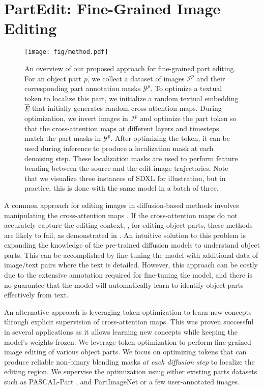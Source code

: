 
\section{PartEdit: Fine-Grained Image Editing}
\label{sec:method}

\begin{figure*}[t]
    \centering
    \texttt{[image: fig/method.pdf]}
    \caption{ An overview of our proposed approach for fine-grained part editing. For an object part $p$, we collect a dataset of images $\mathcal{I}^p$ and their corresponding part annotation masks $\mathcal{Y}^p$. To optimize a textual token to localize this part, we initialize a random textual embedding $\hat{E}$ that initially generates random cross-attention maps. During optimization, we invert images in $\mathcal{I}^p$ and optimize the part token so that the cross-attention maps at different layers and timesteps match the part masks in $\mathcal{Y}^p$. After optimizing the token, it can be used during inference to produce a localization mask at each denoising step. These localization masks are used to perform feature bending between the \colorbox[RGB]{251,229,214}{source} and the \colorbox[RGB]{226,240,217}{edit} image trajectories. Note that we visualize three instances of SDXL \citep{podell2024sdxl} for illustration, but in practice, this is done with the same model in a batch of three.}
    \label{fig:method}
\end{figure*}


A common approach for editing images in diffusion-based methods involves manipulating the cross-attention maps \citep{hertz2022prompt,parmar2023zero,epstein2023diffusion}. 
If the cross-attention maps do not accurately capture the editing context, \eg, for editing object parts, these methods are likely to fail, as demonstrated in .
An intuitive solution to this problem is expanding the knowledge of the pre-trained diffusion models to understand object parts.
This can be accomplished by fine-tuning the model with additional data of image/text pairs where the text is detailed.
However, this approach can be costly due to the extensive annotation required for fine-tuning the model, and there is no guarantee that the model will automatically learn to identify object parts effectively from text.

An alternative approach is leveraging token optimization \citep{zhou2022learning} to learn new concepts through explicit supervision of cross-attention maps.
This was proven successful in several applications \citep{hedlin2023keypoints,khani2024slime,marcos2024ovam} as it allows learning new concepts while keeping the model's weights frozen.
We leverage token optimization to perform fine-grained image editing of various object parts.
We focus on optimizing tokens that can produce reliable non-binary blending masks \emph{at each diffusion step} to localize the editing region.
We supervise the optimization using either existing parts datasets such as PASCAL-Part \citep{pascalpart}, and PartImageNet \citep{he2022partimagenet} or a few user-annotated images.

